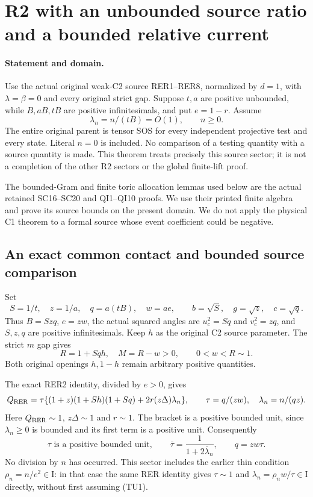\section{R2 with an unbounded source ratio and a bounded relative current}
\label{sec:r2-thin-new}

\paragraph{Statement and domain.}
Use the actual original weak-C2 source RER1--RER8, normalized by
$d=1$, with $\lambda=\beta=0$ and every original strict gap.
Suppose $t,a$ are positive unbounded, while $B,aB,tB$ are
positive infinitesimals, and put $e=1-r$.  Assume
\[
             \lambda_n=n/(tB)=O(1),\qquad n\geq0.       \tag{TU1}
\]
The entire original parent is tensor SOS for every independent
projective test and every state.  Literal $n=0$ is included.
No comparison of a testing quantity with a source quantity is made.
This theorem treats precisely this source sector; it is not a
completion of the other R2 sectors or the global finite-lift proof.

The bounded-Gram and finite toric allocation lemmas used below are
the actual retained SC16--SC20 and QI1--QI10 proofs.  We use their
printed finite algebra and prove its source bounds on the present
domain.  We do not apply the physical C1 theorem to a formal source
whose event coefficient could be negative.

\subsection{An exact common contact and bounded source comparison}

Set
\[
 S=1/t,\quad z=1/a,\quad q=a(tB),\quad w=ae,\qquad
 b=\sqrt S,\quad g=\sqrt z,\quad c=\sqrt q.
                                                               \tag{TU2}
\]
Thus $B=Szq$, $e=zw$, the actual squared angles are
$u_c^2=Sq$ and $v_c^2=zq$, and $S,z,q$ are positive
infinitesimals.  Keep $h$ as the original C2 source parameter.
The strict $m$ gap gives
\[
 R=1+Sqh,\quad M=R-w>0,
 \qquad 0<w<R\sim1.                                      \tag{TU3}
\]
Both original openings $h,1-h$ remain arbitrary positive quantities.

The exact RER2 identity, divided by $e>0$, gives
\[
 Q_{\rm RER}
 =\tau\{(1+z)(1+Sh)(1+Sq)+2r(z\Delta)\lambda_n\},
 \qquad \tau=q/(zw),\quad \lambda_n=n/(qz).
\]
Here $Q_{\rm RER}\sim1$, $z\Delta\sim1$ and $r\sim1$.
The bracket is a positive bounded unit, since $\lambda_n\geq0$
is bounded and its first term is a positive unit.  Consequently
\[
 \tau\text{ is a positive bounded unit},\qquad
 \overline\tau=\frac1{1+2\overline\lambda_n},\qquad
 q=zw\tau.
                                                               \tag{TU4}
\]
No division by $n$ has occurred.  This sector includes the earlier
thin condition $\rho_n=n/e^2\in\mathrm I$: in that case the same
RER identity gives $\tau\sim1$ and
$\lambda_n=\rho_nw/\tau\in\mathrm I$ directly, without first
assuming (TU1).

